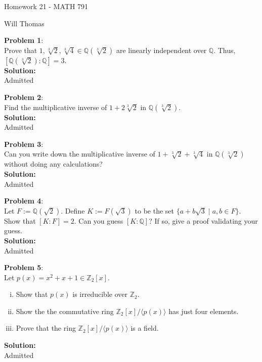 \documentclass[11pt]{article}
\newcommand{\prob}[3]{\begin{flushleft}
        \textbf{Problem #1}: \\
        #2 
		\textbf{Solution:} 
		#3

\end{flushleft}}
\newcommand{\lr}[1]{
  \langle #1 \rangle
}
\newcommand{\makeHWtitle}[1]{
    \begin{center}
    \Large{Homework #1 - MATH 791} 
        \vspace{5pt}
        
        \normalsize{Will Thomas}
        \vspace{5pt}
    \end{center}
}
\begin{document}
\makeHWtitle{21}

\prob{1}{
  Prove that $1, \sqrt[3]{2}, \sqrt[3]{4} \in \mathbb{Q}(\sqrt[3]{2})$
  are linearly independent over $\mathbb{Q}$.
  Thus, $[\mathbb{Q}(\sqrt[3]{2}) : \mathbb{Q}] = 3$. \\
}{\\
  Admitted
}

\prob{2}{
  Find the multiplicative inverse of $1 + 2 \sqrt[3]{2}$ in $\mathbb{Q}(\sqrt[3]{2})$. \\
}{\\
  Admitted
}

\prob{3}{
  Can you write down the multiplicative inverse of $1 + \sqrt[3]{2} + \sqrt[3]{4}$ in $\mathbb{Q}(\sqrt[3]{2})$ without doing any calculations? \\
}{\\
  Admitted
}

\prob{4}{
  Let $F := \mathbb{Q}(\sqrt{2})$. Define $K := F(\sqrt{3})$ to be the set $\{ a + b \sqrt{3} \mid a, b \in F \}$. Show that $[K : F] = 2$.
  Can you guess $[K : \mathbb{Q}]$? If so, give a proof validating your guess. \\
}{\\
  Admitted
}

\prob{5}{
Let $p(x) = x^2 + x + 1 \in \mathbb{Z}_2[x]$.
\begin{enumerate}[(i)]
  \item Show that $p(x)$ is irreducible over $\mathbb{Z}_2$.
  \item Show the the commutative ring $\mathbb{Z}_2[x] / \lr{p(x)}$ has just four elements.
  \item Prove that the ring $\mathbb{Z}_2[x] / \lr{p(x)}$ is a field.
\end{enumerate}
}{\\
Admitted
}
\end{document}
